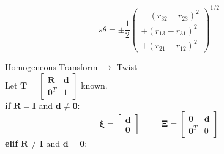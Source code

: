 \documentclass[twocolumn]{article}    %
\begin{document}
\begin{equation*}
    s\theta =  \pm \frac{1}{2} \begin{pmatrix}\quad(r_{32} - r_{23})^2\\ 
    + (r_{13}-r_{31})^2\\
    +(r_{21} -r_{12})^2 
    \end{pmatrix}^{1/2}
\end{equation*}

\newpage
\noindent\underline{Homogeneous Transform \(\longrightarrow\) Twist}\\
Let \(\bm{T} =\begin{bmatrix}
    \bm{R} & \bm{d} \\ \bm{0}^T & 1
\end{bmatrix}\) known.\\
\textbf{if} \(\bm{R} = \bm{I}\) and \(\bm{d} \neq \bm{0}\):
\begin{equation*}
    \bm{\xi} = \begin{bmatrix}
        \bm{d} \\ \bm{0}
    \end{bmatrix} \hspace{30pt} \bm{\Xi} = \begin{bmatrix}
        \bm{0} & \bm{d} \\ \bm{0}^T & 0
    \end{bmatrix}
\end{equation*}
\textbf{elif} \(\bm{R} \neq \bm{I}\) and \(\bm{d} = \bm{0}\):
\end{document}
